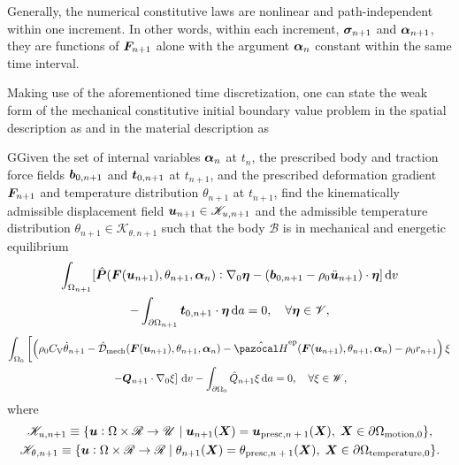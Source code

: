 Generally, the numerical constitutive laws are nonlinear and path-independent within one increment.
In other words, within each increment, $\bm{\sigma}_{n+1}$ and $\bm{\alpha}_{n+1}$, they are functions of $\bm{F}_{n+1}$ alone with the argument $\bm{\alpha}_n$ constant within the same time interval.

Making use of the aforementioned time discretization, one can state the weak form of the mechanical constitutive initial boundary value problem in the spatial description as
and in the material description as
\begin{problem}
    GGiven the set of internal variables $\bm{\alpha}_n$ at $t_n$, the prescribed body and traction force fields $\bm{b}_{0,n+1}$ and $\bm{t}_{0,n+1}$ at $t_{n+1}$, and the prescribed deformation gradient $\bm{F}_{n+1}$ and temperature distribution \(\theta_{n+1}\) at $t_{n+1}$, find the kinematically admissible displacement field $\bm{u}_{n+1}\in\mathscr{K}_{u,n+1}$ and the admissible temperature distribution \(\theta_{n+1}\in\mathscr K_{\theta,n+1}\) such that the body $\mathscr{B}$ is in mechanical and energetic equilibrium
            \begin{multline}
        \int_{\Omega_{n+1}} [\hat{\bm{P}}(\bm{F}(\bm u_{n+1}), \theta_{n+1}, \bm{\alpha}_n):\nabla_0 \bm{\eta} - (\bm{b}_{0,n+1}-\rho_0\ddot{\bm u}_{n+1})\cdot \bm{\eta}]\,\mathrm{d} v\\ - \int_{\partial\Omega_{n+1}} \bm{t}_{0,n+1}\cdot \bm{\eta}\,\mathrm{d} a = 0,\quad \forall \bm{\eta} \in \mathscr{V},
        \end{multline}
        \begin{multline}
        \int_{\Omega_0}   \left[\left(\rho_0C_\mathrm{V}\dot\theta_{n+1} -\hat{\mathcal D}_\text{mech}(\bm F(\bm u_{n+1}), \theta_{n+1}, \bm \alpha_n) - \hat{\pazocal H}^\text{ep}(\bm{F}(\bm u_{n+1}), \theta_{n+1}, \bm \alpha_n)- \rho_0 r_{n+1} \right) \xi\right.\\
        \left. - \bm Q_{n+1}\cdot \nabla_0 \xi\right]\ud v - \int_{\partial\Omega_0} \hat Q_{n+1} \xi\ud a = 0,\quad \forall \xi \in \mathscr{W},
    \end{multline}
    where
    \begin{gather}
            \mathscr{K}_{u,n+1}\equiv \{\bm{u}:\Omega\times \mathscr{R}\to \mathscr{U}\;|\;\bm{u}_{n+1}(\bm{X}) = \bm{u}_\text{presc,$n+1$}(\bm{X}),\;\bm{X}\in\partial \Omega_\text{motion,0}\},\\
            \mathscr{K}_{\theta, n+1}\equiv \{\bm{u}:\Omega\times \mathscr{R}\to \mathscr{R}\;|\;\theta_{n+1}(\bm{X}) = \theta_\text{presc,$n+1$}(\bm{X}),\;\bm{X}\in\partial \Omega_\text{temperature,0}\}.
    \end{gather}
\end{problem}

